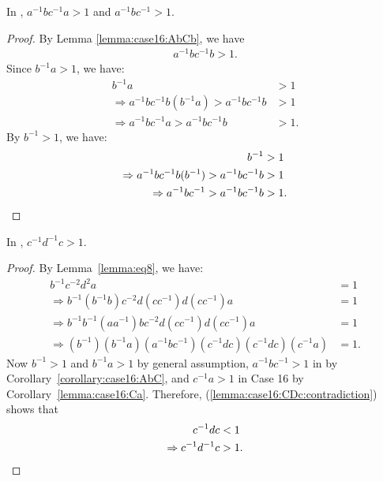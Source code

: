 \begin{corollary} In , $a^{-1}bc^{-1}a>1$ and $a^{-1}bc^{-1}>1$.
\label{corollary:case16:AbC}
\label{corollary:case16:AbCa}
\end{corollary}
\begin{proof}By Lemma \ref{lemma:case16:AbCb}, we have
\begin{align*}
a^{-1}bc^{-1}b>1.
\end{align*}
Since $b^{-1}a>1$, we have:
\begin{align*}
b^{-1}a&>1\\
\Rightarrow{}a^{-1}bc^{-1}b(b^{-1}a)>a^{-1}bc^{-1}b&>1\\
\Rightarrow{}a^{-1}bc^{-1}a>a^{-1}bc^{-1}b&>1.
\end{align*}
By $b^{-1}>1$, we have:
\begin{align*}
b^{-1}&>1\\
\Rightarrow{}a^{-1}bc^{-1}b(b^{-1})>a^{-1}bc^{-1}b&>1\\
\Rightarrow{}a^{-1}bc^{-1}>a^{-1}bc^{-1}b&>1.\qedhere
\end{align*}
\end{proof}

\begin{lemma} In , $c^{-1}d^{-1}c > 1 $.
\label{lemma:case16:CDc}
\end{lemma}
\begin{proof} By Lemma~\ref{lemma:eq8}, we have:
\begin{align}
b^{-1}c^{-2}d^{2}a &= 1\nonumber{}\\
\Rightarrow{}b^{-1}(b^{-1}b)c^{-2}d(cc^{-1})d(cc^{-1})a &= 1\nonumber{}\\
\Rightarrow{}b^{-1}b^{-1}(aa^{-1})bc^{-2}d(cc^{-1})d(cc^{-1})a &= 1\nonumber{}\\
\Rightarrow{}(b^{-1})(b^{-1}a)(a^{-1}bc^{-1})(c^{-1}dc)(c^{-1}dc)(c^{-1}a) &=1.\label{lemma:case16:CDc:contradiction}
\end{align}
Now $b^{-1}>1$ and $b^{-1}a>1$ by general assumption, $a^{-1}bc^{-1}>1$ in  by Corollary~\ref{corollary:case16:AbC}, and $c^{-1}a>1$ in Case 16 by Corollary~\ref{lemma:case16:Ca}. Therefore, (\ref{lemma:case16:CDc:contradiction}) shows that
\begin{align*}
c^{-1}dc&<1\\
\Rightarrow{}c^{-1}d^{-1}c&>1.\qedhere
\end{align*}
\end{proof}

